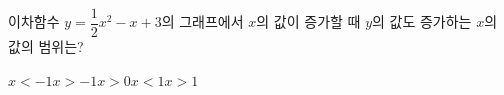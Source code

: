 이차함수 $y=\dfrac{1}{2}x^2-x+3$의 그래프에서 $x$의 값이 증가할 때 $y$의 값도 증가하는 $x$의 값의 범위는?
\begin{choices32}{$x<-1$}{$x>-1$}{$x>0$}{$x<1$}{$x>1$}\end{choices32}
